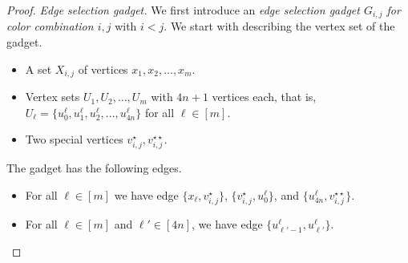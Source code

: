 \documentclass[a4paper,UKenglish,cleveref, autoref, thm-restate, anonymous]{lipics-v2021}
\begin{document}
\begin{proof}
    \emph{Edge selection gadget.} We first introduce an \emph{edge selection gadget $G_{i,j}$ for color combination $i,j$} with $i<j$. We start with describing the vertex set of the gadget.
    \begin{itemize}
        \item A set $X_{i,j}$ of vertices $x_1, x_2, \ldots, x_m$.
        \item Vertex sets $U_1, U_2, \ldots, U_m$ with $4n+1$ vertices each, that is, $U_\ell=\{u^\ell_0, u^\ell_1, u^\ell_2,\ldots, 
        u^\ell_{4n}\}$ for all $\ell\in[m]$. 
        \item Two special vertices $v_{i,j}^\star,v_{i,j}^{\star\star}$.
    \end{itemize}
    The gadget has the following edges.
    \begin{itemize}
        \item For all $\ell\in [m]$ we have edge $\{x_\ell,v_{i,j}^\star\}$, $\{v_{i,j}^\star,u^\ell_0\}$, and $\{u^\ell_{4n},v_{i,j}^{\star\star}\}$. 

        \item For all $\ell\in [m]$ and $\ell'\in [4n]$, we have edge $\{u^\ell_{\ell'-1},u^\ell_{\ell'}\}$.
    \end{itemize}


\end{proof}
\end{document}
